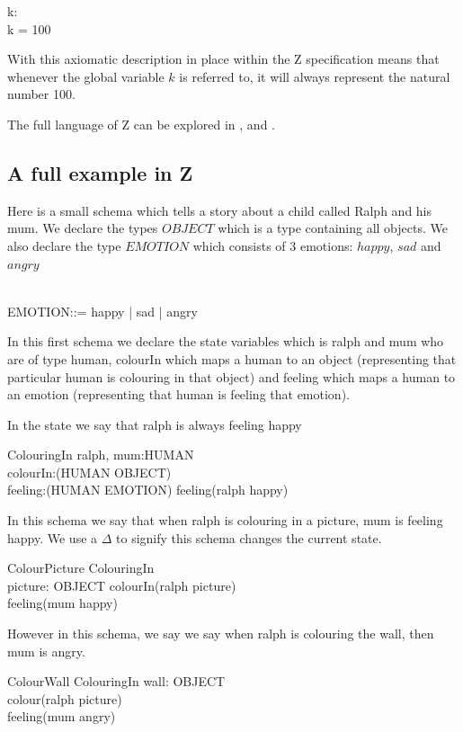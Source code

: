 \begin{axdef}
k: \nat \\
\where
k = 100
\end{axdef}

With this axiomatic description in place within the Z specification means that whenever the global variable $k$ is referred to, it will always represent the natural number 100.

The full language of Z can be explored in \cite{spiveyreferencemanual}, \cite{essenceofz} and \cite{Woodcock:1996:UZS:235337}.

\subsection{A full example in Z}
Here is a small schema which tells a story about a child called Ralph and his mum. We declare the types $OBJECT$ which is a type containing all objects. We also declare the type $EMOTION$ which consists of 3 emotions: $happy$, $sad$ and $angry$

\begin{zed}
[OBJECT] \\
EMOTION::= happy | sad | angry
\end{zed}

In this first schema we declare the state variables which is ralph and mum who are of type human, colourIn which maps a human to an object (representing that particular human is colouring in that object) and feeling which maps a human to an emotion (representing that human is feeling that emotion).

In the state we say that ralph is always feeling happy
\begin{schema}{ColouringIn}
ralph, mum:HUMAN \\
colourIn:(HUMAN \pfun OBJECT) \\
feeling:(HUMAN \pfun EMOTION)
\where
feeling(ralph \mapsto happy)
\end{schema}

In this schema we say that when ralph is colouring in a picture, mum is feeling happy. We use a $\Delta$ to signify this schema changes the current state.
\begin{schema}{ColourPicture}
\Delta ColouringIn \\
picture: OBJECT 
\where
colourIn(ralph \mapsto picture) \\
feeling(mum \mapsto happy)
\end{schema}

However in this schema, we say we say when ralph is colouring the wall, then mum is angry.
\begin{schema}{ColourWall}
\Delta ColouringIn
wall: OBJECT \\
\where
colour(ralph \mapsto picture) \\
feeling(mum \mapsto angry)
\end{schema}

